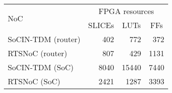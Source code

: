 \begin{tabular}{lrrr}
\toprule
\multirow{2}{*}{NoC} & \multicolumn{3}{c}{FPGA resources} \\
\cmidrule(l){2-4}
                     & \multicolumn{1}{c}{SLICEs} & \multicolumn{1}{c}{LUTs} & \multicolumn{1}{c}{FFs} \\
\midrule
SoCIN-TDM (router)   & ~402                       & ~~772                    & ~372 \\
RTSNoC (router)      & ~807                       & ~~429                    & 1131\\
SoCIN-TDM (SoC)      & 8040                       & 15440                    & 7440\\
RTSNoC (SoC)         & 2421                       & ~1287                    & 3393 \\            
                              
\bottomrule
\end{tabular}

